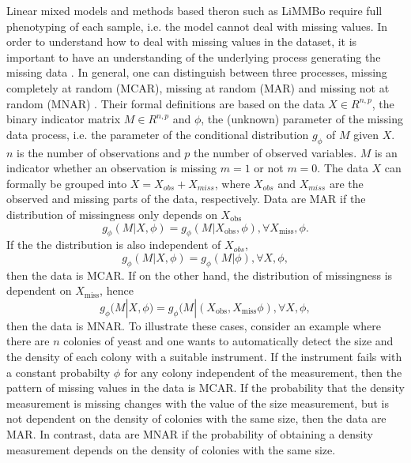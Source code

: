 Linear mixed models and methods based theron such as LiMMBo require full phenotyping of each sample, i.e. the model cannot deal with missing values. In order to understand how to deal with missing values in the dataset, it is important to have an understanding of the underlying process generating the missing data \citep{Rubin1976}. In general, one can distinguish between three processes, missing completely at random (MCAR), missing at random (MAR) and missing not at random (MNAR) \citep{Rubin2002}. Their formal definitions are based on the data \(X  \in R^{n,p}\),  the binary indicator matrix \(M  \in R^{n,p}\)  and \(\phi\), the (unknown) parameter of the missing data process, i.e. the parameter of the conditional distribution \(g_\phi\) of \(M\) given \(X\). \(n\) is the number of observations and \(p\) the number of observed variables. \(M\) is an indicator whether an observation is missing \(m = 1 \) or not \(m = 0\). The data \(X\) can formally be grouped into \(X=X_{obs} + X_{miss}\), where  \(X_{obs}\) and  \(X_{miss}\) are the observed and missing parts of the data, respectively. Data are MAR if the distribution of missingness only depends on \(X_{\text{obs}}\)
\begin{equation}
g_\phi(M | X, \phi) =  g_\phi(M | X_{\text{obs}}, \phi),  \forall X_\text{miss}, \phi.
\end{equation}
If the the distribution is also independent of \(X_{obs}\), 
\begin{equation}
g_\phi(M | X, \phi) =  g_\phi(M | \phi), \forall X, \phi,
\end{equation}
then the data is MCAR. If on the other hand, the distribution of missingness is dependent on \(X_{\text{miss}}\), hence
\begin{equation}
g_\phi(M | X, \phi) =  g_\phi(M | (X_{\text{obs}}, X_{\text{miss}}\phi), \forall X, \phi,
\end{equation}
then the data is MNAR. To illustrate these cases, consider an example where there are \(n\) colonies of yeast and one wants to automatically detect the size and the density of each colony with a suitable instrument. If the instrument fails with a constant probabilty \(\phi\) for any colony independent of the measurement, then the pattern of missing values in the data is MCAR. If the probability that the density measurement is missing changes with the value of the size measurement, but is not dependent on the density of colonies with the same size, then the data are MAR. In contrast, data are MNAR if the probability of obtaining a density measurement depends on the density of colonies with the same size. 

